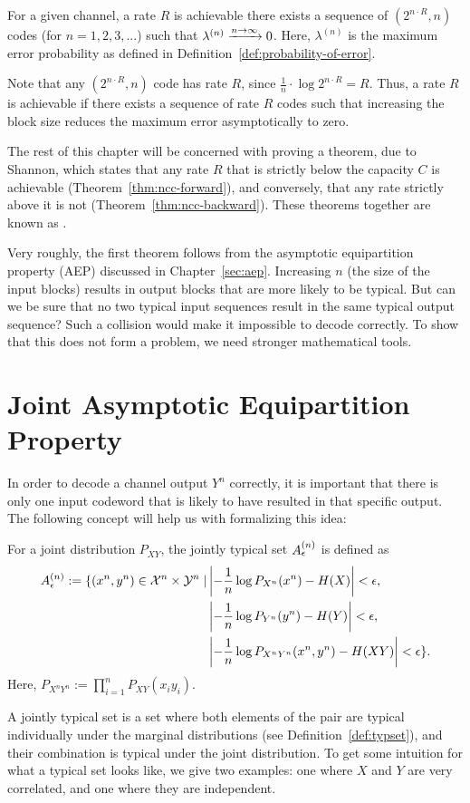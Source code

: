 \begin{definition}
For a given channel, a rate $R$ is achievable there exists a sequence of $(2^{n \cdot R},n)$ codes (for $n = 1,2,3,...$) such that $\lambda^{(n)} \xrightarrow{n \to \infty} 0$. Here, $\lambda^{(n)}$ is the maximum error probability as defined in Definition~\ref{def:probability-of-error}.
\end{definition}
Note that any $(2^{n \cdot R},n)$ code has rate $R$, since $\frac{1}{n} \cdot \log {2^{n \cdot R}} = R$. Thus, a rate $R$ is achievable if there exists a sequence of rate $R$ codes such that increasing the block size reduces the maximum error asymptotically to zero.

The rest of this chapter will be concerned with proving a theorem, due to Shannon, which states that any rate $R$ that is strictly below the capacity $C$ is achievable (Theorem~\ref{thm:ncc-forward}), and conversely, that any rate strictly above it is not (Theorem~\ref{thm:ncc-backward}). These theorems together are known as .

Very roughly, the first theorem follows from the asymptotic equipartition property (AEP) discussed in Chapter~\ref{sec:aep}. Increasing $n$ (the size of the input blocks) results in output blocks that are more likely to be typical. But can we be sure that no two typical input sequences result in the same typical output sequence? Such a collision would make it impossible to decode correctly. To show that this does not form a problem, we need stronger mathematical tools.

\section{Joint Asymptotic Equipartition Property}
In order to decode a channel output $Y^n$ correctly, it is important that there is only one input codeword that is likely to have resulted in that specific output. The following concept will help us with formalizing this idea:

\begin{definition}\label{def:joint-typicality}
For a joint distribution $P_{XY}$, the jointly typical set $A_{\epsilon}^{(n)}$ is defined as
\begin{align*}
A_{\epsilon}^{(n)} := \{(x^n,y^n) \in \mathcal{X}^n \times \mathcal{Y}^n \mid &\left| - \frac{1}{n} \log P_{X^n}(x^n) - H(X)\right| < \epsilon,\\
&\left| - \frac{1}{n} \log P_{Y^n}(y^n) - H(Y)\right| < \epsilon,\\
&\left| - \frac{1}{n} \log P_{X^nY^n}(x^n,y^n) - H(XY)\right| < \epsilon\}.
\end{align*}
Here, $P_{X^nY^n} := \prod_{i=1}^nP_{XY}(x_iy_i)$.
\end{definition}
A jointly typical set is a set where both elements of the pair are typical individually under the marginal distributions (see Definition~\ref{def:typset}), and their combination is typical under the joint distribution. To get some intuition for what a typical set looks like, we give two examples: one where $X$ and $Y$ are very correlated, and one where they are independent.



